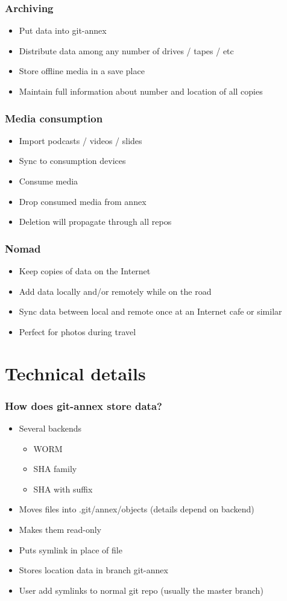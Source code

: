 \documentclass[t]{beamer}
\begin{document}
\begin{frame}
	\frametitle{Archiving}
	\begin{itemize}
		\item Put data into git-annex
		\item Distribute data among any number of drives / tapes / etc
		\item Store offline media in a save place
		\item Maintain full information about number and location of all copies
	\end{itemize}
\end{frame}

\begin{frame}
	\frametitle{Media consumption}
	\begin{itemize}
		\item Import podcasts / videos / slides
		\item Sync to consumption devices
		\item Consume media
		\item Drop consumed media from annex
		\item Deletion will propagate through all repos
	\end{itemize}
\end{frame}

\begin{frame}
	\frametitle{Nomad}
	\begin{itemize}
		\item Keep copies of data on the Internet
		\item Add data locally and/or remotely while on the road
		\item Sync data between local and remote once at an Internet cafe or similar
		\item Perfect for photos during travel
	\end{itemize}
\end{frame}

\section{Technical details}

\begin{frame}
	\frametitle{How does git-annex store data?}
	\begin{itemize}
		\item Several backends
		\begin{itemize}
			\item WORM
			\item SHA family
			\item SHA with suffix
		\end{itemize}
		\item Moves files into .git/annex/objects (details depend on backend)
		\item Makes them read-only
		\item Puts symlink in place of file
		\item Stores location data in branch git-annex
		\item User add symlinks to normal git repo (usually the master branch)
	\end{itemize}
\end{frame}


\end{document}

